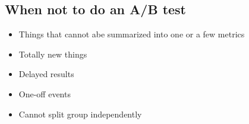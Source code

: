 \documentclass[]{article}
\begin{document}
\begin{multicols}{2}
    \subsection*{When not to do an A/B test}
    \begin{itemize}
        \item Things that cannot abe summarized into one or a few metrics
        \item Totally new things
        \item Delayed results
        \item One-off events
        \item Cannot split group independently
    \end{itemize}



\end{multicols}
\end{document}
